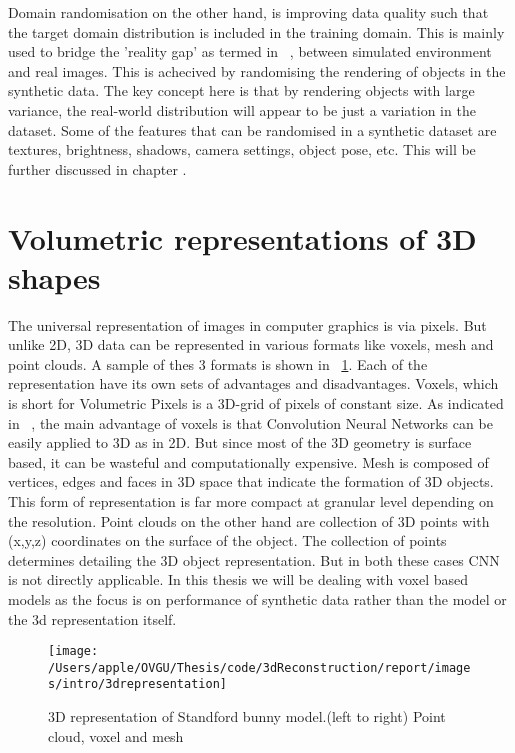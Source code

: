 Domain randomisation on the other hand, is improving data quality such that the target domain distribution is included in the training domain.
This is mainly used to bridge the 'reality gap' as termed in ~\cite{tobin2017domain}, between simulated environment and real images.
This is achecived by randomising the rendering of objects in the synthetic data.
The key concept here is that by rendering objects with large variance, the real-world distribution will appear to be just a variation in the dataset.
Some of the features that can be randomised in a synthetic dataset are textures, brightness, shadows, camera settings, object pose, etc. This will be further discussed in chapter .


\section{Volumetric representations of 3D shapes}
The universal representation of images in computer graphics is via pixels.
But unlike 2D, 3D data can be represented in various formats like voxels, mesh and point clouds.
A sample of thes 3 formats is shown in ~\ref{fig:3d representation}.
Each of the representation have its own sets of advantages and disadvantages.
Voxels, which is short for Volumetric Pixels is a 3D-grid of pixels of constant size.
As indicated in ~\cite{li2016fpnn}, the main advantage of voxels is that Convolution Neural Networks can be easily applied to 3D as in 2D.
But since most of the 3D geometry is surface based, it can be wasteful and computationally expensive.
Mesh is composed of vertices, edges and faces in 3D space that indicate the formation of 3D objects.
This form of representation is far more compact at granular level depending on the resolution.
Point clouds on the other hand are collection of 3D points with (x,y,z) coordinates on the surface of the object.
The collection of points determines detailing the 3D object representation. But in both these cases CNN is not directly applicable.
In this thesis we will be dealing with voxel based models as the focus is on performance of synthetic data rather than the model or the 3d representation itself.

\begin{figure}
    \centering
    \texttt{[image: /Users/apple/OVGU/Thesis/code/3dReconstruction/report/images/intro/3drepresentation]}
    \caption{3D representation of Standford bunny model.(left to right) Point cloud, voxel and mesh ~\cite{Hoang2019ADL}
    \label{fig:3d representation}}
\end{figure}
